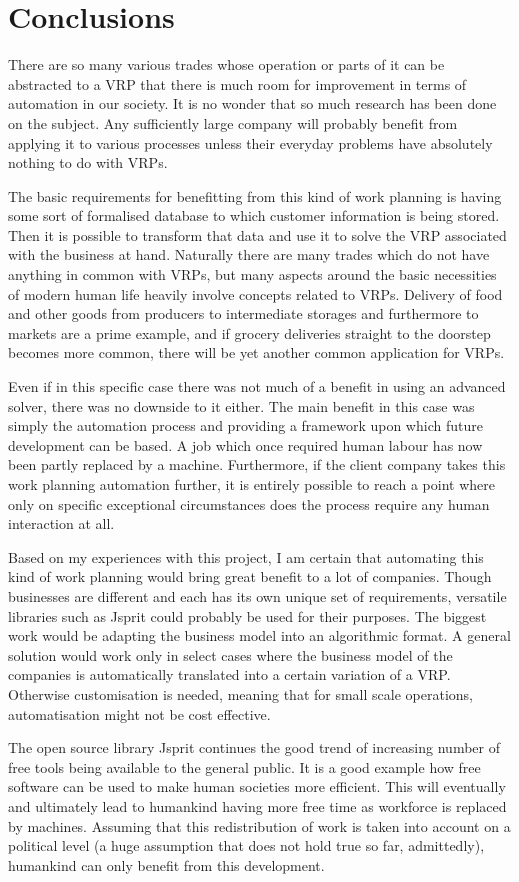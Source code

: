 \chapter{Conclusions}
\label{chapter:discussion}

There are so many various trades whose operation or parts of it can be abstracted to a VRP that there is much room for improvement in terms of automation in our society. It is no wonder that so much research has been done on the subject. Any sufficiently large company will probably benefit from applying it to various processes unless their everyday problems have absolutely nothing to do with VRPs.

The basic requirements for benefitting from this kind of work planning is having some sort of formalised database to which customer information is being stored. Then it is possible to transform that data and use it to solve the VRP associated with the business at hand. Naturally there are many trades which do not have anything in common with VRPs, but many aspects around the basic necessities of modern human life heavily involve concepts related to VRPs. Delivery of food and other goods from producers to intermediate storages and furthermore to markets are a prime example, and if grocery deliveries straight to the doorstep becomes more common, there will be yet another common application for VRPs.  

Even if in this specific case there was not much of a benefit in using an advanced solver, there was no downside to it either. The main benefit in this case was simply the automation process and providing a framework upon which future development can be based. A job which once required human labour has now been partly replaced by a machine. Furthermore, if the client company takes this work planning automation further, it is entirely possible to reach a point where only on specific exceptional circumstances does the process require any human interaction at all. 

Based on my experiences with this project, I am certain that automating this kind of work planning would bring great benefit to a lot of companies. Though businesses are different and each has its own unique set of requirements, versatile libraries such as Jsprit could probably be used for their purposes. The biggest work would be adapting the business model into an algorithmic format. A general solution would work only in select cases where the business model of the companies is automatically translated into a certain variation of a VRP. Otherwise customisation is needed, meaning that for small scale operations, automatisation might not be cost effective. 

The open source library Jsprit continues the good trend of increasing number of free tools being available to the general public. It is a good example how free software can be used to make human societies more efficient. This will eventually and ultimately lead to humankind having more free time as workforce is replaced by machines. Assuming that this redistribution of work is taken into account on a political level (a huge assumption that does not hold true so far, admittedly), humankind can only benefit from this development.


